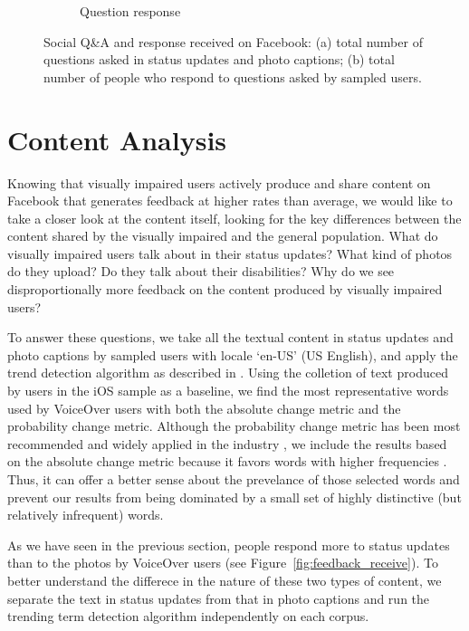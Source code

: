\documentclass{sigchi}
\begin{document}
\begin{figure}
\begin{subfigure}[b]{0.23\textwidth}
    \caption{Question response}
    \label{fig:question_response}
 \end{subfigure}
 \caption{Social Q\&A and response received on Facebook: (a) total number of questions asked in status updates and photo captions; (b) total number of people who respond to questions asked by sampled users.}
\label{fig:question}
\end{figure}

\section{Content Analysis}

Knowing that visually impaired users actively produce and share content on Facebook that generates feedback at higher rates than average, we would like to take a closer look at the content itself, looking for the key differences between the content shared by the visually impaired and the general population. What do visually impaired users talk about in their status updates? What kind of photos do they upload? Do they talk about their disabilities? Why do we see disproportionally more feedback on the content produced by visually impaired users?

To answer these questions, we take all the textual content in status updates and photo captions by sampled users with locale `en-US' (US English),  and apply the trend detection algorithm as described in \cite{kleinberg2004}.  Using the colletion of text produced by users in the iOS sample as a baseline, we find the most representative words used by VoiceOver users with both the absolute change metric and the probability change metric. Although the probability change metric has been most recommended and widely applied in the industry \cite{FacebookTrend}, we include the results based on the absolute change metric because it favors words with higher frequencies \cite{kleinberg2004}. Thus, it can offer a better sense about the prevelance of those selected words and prevent our results from being dominated by a small set of highly distinctive (but relatively infrequent) words. 

As we have seen in the previous section, people respond more to status updates than to the photos by VoiceOver users (see Figure~\ref{fig:feedback_receive}). To better understand the differece in the nature of these two types of content, we separate the text in status updates from that in photo captions and run the trending term detection algorithm independently on each corpus. 
\end{document}
